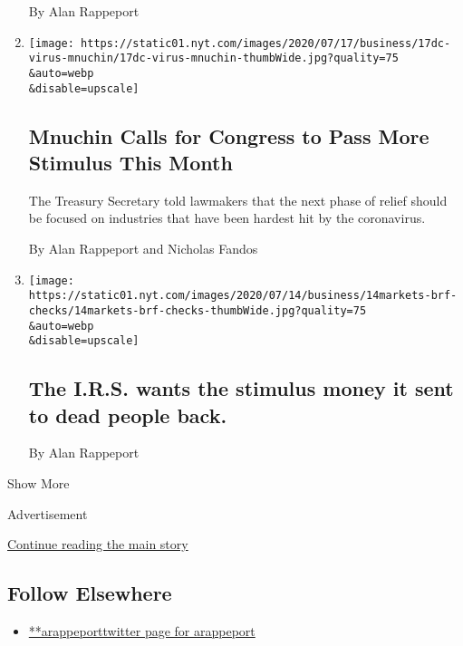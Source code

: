 \begin{enumerate}
  By Alan Rappeport
\item
  \href{/2020/07/17/us/politics/mnuchin-congress-stimulus.html}{}

  \texttt{[image: https://static01.nyt.com/images/2020/07/17/business/17dc-virus-mnuchin/17dc-virus-mnuchin-thumbWide.jpg?quality=75\\\&auto=webp\\\&disable=upscale]}

  \hypertarget{mnuchin-calls-for-congress-to-pass-more-stimulus-this-month}{%
  \subsection{Mnuchin Calls for Congress to Pass More Stimulus This
  Month}\label{mnuchin-calls-for-congress-to-pass-more-stimulus-this-month}}

  The Treasury Secretary told lawmakers that the next phase of relief
  should be focused on industries that have been hardest hit by the
  coronavirus.

  By Alan Rappeport and Nicholas Fandos
\item
  \href{/live/2020/07/14/business/stock-market-updates-coronavirus/the-irs-wants-the-stimulus-money-it-sent-to-dead-people-back}{}

  \texttt{[image: https://static01.nyt.com/images/2020/07/14/business/14markets-brf-checks/14markets-brf-checks-thumbWide.jpg?quality=75\\\&auto=webp\\\&disable=upscale]}

  \hypertarget{the-irs-wants-the-stimulus-money-it-sent-to-dead-people-back}{%
  \subsection{The I.R.S. wants the stimulus money it sent to dead people
  back.}\label{the-irs-wants-the-stimulus-money-it-sent-to-dead-people-back}}

  By Alan Rappeport
\end{enumerate}

Show More

Advertisement

\protect\hyperlink{after-mid2}{Continue reading the main story}

\hypertarget{follow-elsewhere}{%
\subsection{Follow Elsewhere}\label{follow-elsewhere}}

\begin{itemize}
\tightlist
\item
  \href{https://twitter.com/arappeport}{**arappeporttwitter page for
  arappeport}
\end{itemize}


